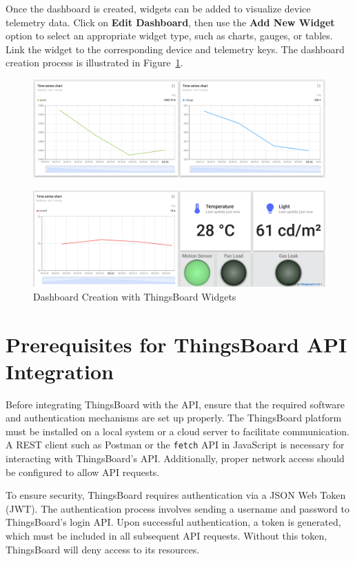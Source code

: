 \documentclass[a4paper,12pt]{report}
\begin{document}
 Once the dashboard is created, widgets can be added to visualize device telemetry data. Click on \textbf{Edit Dashboard}, then use the \textbf{Add New Widget} option to select an appropriate widget type, such as charts, gauges, or tables. Link the widget to the corresponding device and telemetry keys. The dashboard creation process is illustrated in Figure~\ref{fig:dashboard_creation2}.
 \begin{figure}[H]
    \centering
    \includegraphics[width=1\textwidth]{dashboard2.PNG}
 \end{figure}
 \begin{figure}[H]
    \centering
    \includegraphics[width=1\textwidth]{dashboard1.PNG}
    \caption{Dashboard Creation with ThingsBoard Widgets}
    \label{fig:dashboard_creation2}
 \end{figure}
 \section{Prerequisites for ThingsBoard API Integration}
 
 Before integrating ThingsBoard with the API, ensure that the required software and authentication mechanisms are set up properly. The ThingsBoard platform must be installed on a local system or a cloud server to facilitate communication. A REST client such as Postman or the \texttt{fetch} API in JavaScript is necessary for interacting with ThingsBoard’s API. Additionally, proper network access should be configured to allow API requests.
 
 To ensure security, ThingsBoard requires authentication via a JSON Web Token (JWT). The authentication process involves sending a username and password to ThingsBoard’s login API. Upon successful authentication, a token is generated, which must be included in all subsequent API requests. Without this token, ThingsBoard will deny access to its resources.
 
\end{document}
